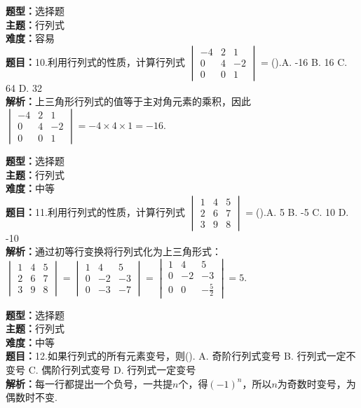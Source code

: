 \documentclass{ctexart}
\newenvironment{question}[5]{%
	\noindent\textbf{题型：}#1\\
	\textbf{主题：}#2\\
	\textbf{难度：}#3\\
	\textbf{题目：}#4\\
	\textbf{解析：}#5\\
	\vspace{1em}
}{}
\begin{document}
	\begin{question}
		{选择题}
		{行列式}
		{容易}
		{10.利用行列式的性质，计算行列式 \(\begin{vmatrix}-4 & 2 & 1 \\ 0 & 4 & -2 \\ 0 & 0 & 1\end{vmatrix}=\)().A. -16 B. 16 C. 64 D. 32}
		{上三角形行列式的值等于主对角元素的乘积，因此 \(\begin{vmatrix}-4 & 2 & 1 \\ 0 & 4 & -2 \\ 0 & 0 & 1\end{vmatrix}=-4 \times 4 \times 1=-16\).}
	\end{question}
	
	\begin{question}
		{选择题}
		{行列式}
		{中等}
		{11.利用行列式的性质，计算行列式 \(\begin{vmatrix}1 & 4 & 5 \\ 2 & 6 & 7 \\ 3 & 9 & 8\end{vmatrix}=\)().A. 5 B. -5 C. 10 D. -10}
		{通过初等行变换将行列式化为上三角形式：\(\begin{vmatrix}1 & 4 & 5 \\ 2 & 6 & 7 \\ 3 & 9 & 8\end{vmatrix}=\begin{vmatrix}1 & 4 & 5 \\ 0 & -2 & -3 \\ 0 & -3 & -7\end{vmatrix}=\begin{vmatrix}1 & 4 & 5 \\ 0 & -2 & -3 \\ 0 & 0 & -\frac{5}{2}\end{vmatrix}=5\).}
	\end{question}
	
	\begin{question}
		{选择题}
		{行列式}
		{中等}
		{12.如果行列式的所有元素变号，则(). A. 奇阶行列式变号 B. 行列式一定不变号 C. 偶阶行列式变号 D. 行列式一定变号}
		{每一行都提出一个负号，一共提\(n\)个，得\((-1)^n\)，所以\(n\)为奇数时变号，为偶数时不变. }
	\end{question}
	
\end{document}
